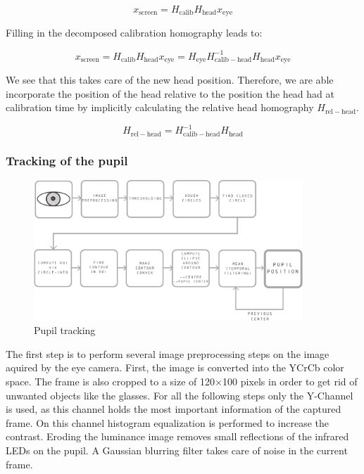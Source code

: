 \begin{equation}
  x_\mathrm{screen} = H_\mathrm{calib}H_\mathrm{head}x_\mathrm{eye} 
\end{equation}

Filling in the decomposed calibration homography leads to:

\begin{equation}
  x_\mathrm{screen} = H_\mathrm{calib}H_\mathrm{head}x_\mathrm{eye} = H_\mathrm{eye} H_\mathrm{calib-head} ^{-1} H_\mathrm{head} x_\mathrm{eye}
\end{equation}

We see that this takes care of the new head position. Therefore, we are able incorporate the position of the head relative to the position the head had at calibration time by implicitly calculating the relative head homography $H_\mathrm{rel-head}$.

\begin{equation}
  H_\mathrm{rel-head} = H_\mathrm{calib-head}^{-1} H_\mathrm{head}
\end{equation}

\subsubsection{Tracking of the pupil}
\begin{figure}[H]
  \centering
  \includegraphics[width=0.9\textwidth]{../finalpres/02c.pdf}
  \caption{Pupil tracking}\label{fig:pupil}
\end{figure}
The first step is to perform several image preprocessing steps on the image aquired by the eye camera. First, the image is converted into the YCrCb color space. The frame is also cropped to a size of 120$\times$100 pixels in order to get rid of unwanted objects like the glasses.
For all the following steps only the Y-Channel is used, as this channel holds the most important information of the captured frame. 
On this channel histogram equalization is performed to increase the contrast. 
Eroding the luminance image removes small reflections of the infrared LEDs on the pupil. 
A Gaussian blurring filter takes care of noise in the current frame. 

